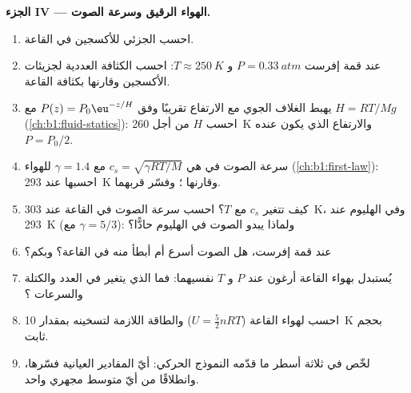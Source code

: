 \begin{problem}
\medskip
\noindent\textbf{الجزء IV --- الهواء الرقيق وسرعة الصوت.}
\begin{enumerate}[resume]
  \item احسب  الجزئي للأكسجين في القاعة.
  \item عند قمة إفرست $P = \qty{0.33}{atm}$ و $T \approx \qty{250}{K}$:
        احسب الكثافة العددية لجزيئات الأكسجين وقارنها بكثافة القاعة.
  \item يهبط  الغلاف الجوي مع الارتفاع تقريبًا وفق
        $P(z) = P_0\eu^{-z/H}$ مع $H = RT/Mg$ (\cref{ch:b1:fluid-statics}):
        احسب $H$ من أجل \qty{260}{K} والارتفاع الذي يكون عنده $P = P_0/2$.
  \item سرعة الصوت في  هي $c_s = \sqrt{\gamma RT/M}$
        مع $\gamma = 1.4$ للهواء (\cref{ch:b1:first-law}): احسبها عند
        \qty{293}{K} وقارنها ؛ وفسّر
        قربهما.
  \item كيف تتغير $c_s$ مع $T$؟ احسب سرعة الصوت في القاعة عند
        \qty{303}{K}، وفي الهليوم عند \qty{293}{K} (مع $\gamma = 5/3$): ولماذا
        يبدو الصوت في الهليوم حادًّا؟
  \item عند قمة إفرست، هل الصوت أسرع أم أبطأ منه في
        القاعة؟ وبكم؟
  \item يُستبدل بهواء القاعة أرغون عند $P$ و $T$ نفسيهما:
        فما الذي يتغير في العدد والكتلة والسرعات ؟
  \item احسب  لهواء القاعة ($U = \tfrac52 nRT$)
        والطاقة اللازمة لتسخينه بمقدار \qty{10}{K} بحجم ثابت.
  \item لخّص في ثلاثة أسطر ما قدّمه النموذج الحركي: أيّ
        المقادير العيانية فسّرها، وانطلاقًا من أيّ متوسط مجهري
        واحد.
\end{enumerate}
\end{problem}
